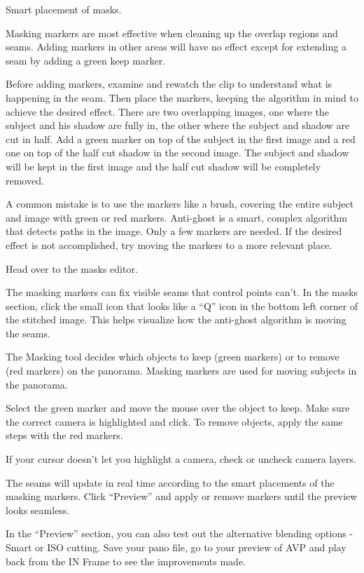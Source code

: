 \begin{fullwidth}
{\large Smart placement of masks. \par}

Masking markers are most effective when cleaning up the overlap regions and seams. Adding markers in other areas will have no effect except for extending a seam by adding a green keep marker. 

Before adding markers, examine and rewatch the clip to understand what is happening in the seam. Then place the markers, keeping the algorithm in mind to achieve the desired effect. There are two overlapping images, one where the subject and his shadow are fully in, the other where the subject and shadow are cut in half. Add a green marker on top of the subject in the first image and a red one on top of the half cut shadow in the second image. The subject and shadow will be kept in the first image and the half cut shadow will be completely removed. 


A common mistake is to use the markers like a brush, covering the entire subject and image with green or red markers. Anti-ghost is a smart, complex algorithm that detects paths in the image. Only a few markers are needed. If the desired effect is not accomplished, try moving the markers to a more relevant place. 


Head over to the masks editor.


The masking markers can fix visible seams that control points can’t. In the masks section, click the small icon that looks like a “Q” icon in the bottom left corner of the stitched image. This helps visualize how the anti-ghost algorithm is moving the seams.


The Masking tool decides which objects to keep (green markers) or to remove (red markers) on the panorama. Masking markers are used for moving subjects in the panorama.

Select the green marker and move the mouse over the object to keep. Make sure the correct camera is highlighted and click. To remove objects, apply the same steps with the red markers.


\tip If your cursor doesn’t let you highlight a camera, check or uncheck camera layers.


The seams will update in real time according to the smart placements of the masking markers. Click “Preview” and apply or remove markers until the preview looks seamless.



In the “Preview” section, you can also test out the alternative blending options - Smart or ISO cutting. Save your pano file, go to your preview of AVP and play back from the IN Frame to see the improvements made.


\clearpage
\end{fullwidth}